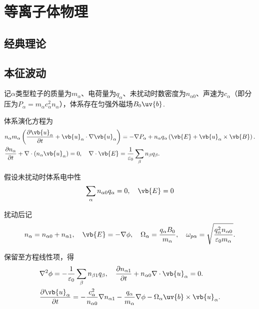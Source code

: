
\chapter{等离子体物理}
\section{经典理论}

\section{本征波动}
记\(\alpha\)类型粒子的质量为\(m_\alpha\)、电荷量为\(q_\alpha\)、未扰动时数密度为\(n_{\alpha 0}\)、声速为\(c_\alpha\)（即分压为\(P_\alpha = m_\alpha c_\alpha^2 n_\alpha\)），体系存在匀强外磁场\(B_0 \uv{b}\).

体系演化方程为
\begin{align*}
	&n_\alpha m_\alpha \left( \frac{\partial \vb{u}_\alpha}{\partial t} + \vb{u}_\alpha\cdot\nabla \vb{u}_\alpha \right) = -\nabla P_\alpha + n_\alpha q_\alpha \left( \vb{E} + \vb{u}_\alpha\times\vb{B} \right). \\
	&\frac{\partial n_\alpha}{\partial t} + \nabla\cdot\left(n_\alpha \vb{u}_\alpha\right) = 0,\quad \nabla\cdot\vb{E} = \frac{1}{\varepsilon_0}\sum_\beta n_\beta q_\beta.
\end{align*}

假设未扰动时体系电中性
\begin{align*}
	\sum_\alpha n_{\alpha 0} q_\alpha = 0,\quad\vb{E} = 0
\end{align*}

扰动后记
\begin{align*}
	n_\alpha = n_{\alpha 0} + n_{\alpha 1},\quad
	\vb{E} = -\nabla\phi,\quad
	\Omega_\alpha = \frac{q_\alpha B_0}{m_\alpha},\quad
	\omega_{p\alpha} = \sqrt{\frac{q_\alpha^2 n_{\alpha 0}}{\varepsilon_0 m_\alpha}}.
\end{align*}

保留至方程线性项，得
\begin{align*}
	&\nabla^2\phi = -\frac{1}{\varepsilon_0}\sum_\beta n_{\beta 1} q_\beta,\quad
	\frac{\partial n_{\alpha 1}}{\partial t} + n_{\alpha 0}\nabla\cdot\vb{u}_\alpha = 0. \\
	&\frac{\partial \vb{u}_\alpha}{\partial t} = -\frac{c_\alpha^2}{n_{\alpha 0}}\nabla n_{\alpha 1} - \frac{q_\alpha}{m_\alpha}\nabla\phi - \Omega_\alpha \uv{b}\times\vb{u}_\alpha.
\end{align*}

